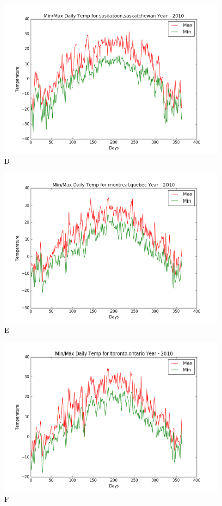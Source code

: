 \documentclass[12pt,letterpaper]{article}
\begin{document}
\begin{figure}
\centering
\includegraphics[scale=0.6]{Plot03.png}
\caption{D}
\end{figure}

\begin{figure}
\centering
\includegraphics[scale=0.6]{Plot04.png}
\caption{E}
\end{figure}

\begin{figure}
\centering
\includegraphics[scale=0.6]{Plot05.png}
\caption{F}
\end{figure}
\end{document}
